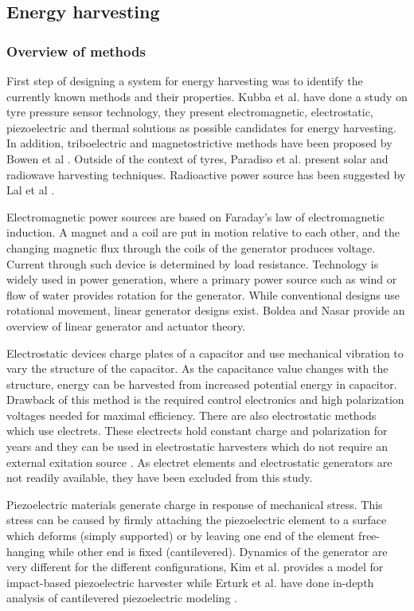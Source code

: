 \subsection{Energy harvesting}
\subsubsection{Overview of methods}
First step of designing a system for energy harvesting was to identify the currently known methods and their properties. Kubba et al. \cite{Kubba2014} have done a study on tyre pressure sensor technology, they present electromagnetic, electrostatic, piezoelectric and thermal solutions as possible candidates for energy harvesting. In addition, triboelectric and magnetostrictive methods have been proposed by Bowen et al \cite{Bowen2014}. Outside of the context of tyres, Paradiso et al. \cite{Paradiso2005} present solar and radiowave harvesting techniques. Radioactive power source has been suggested by Lal et al \cite{Lal2004}. 

Electromagnetic power sources are based on Faraday's law of electromagnetic induction. A magnet and a coil are put in motion relative to each other, and the changing magnetic flux through the coils of the generator produces voltage. Current through such device is determined by load resistance. Technology is widely used in power generation, where a primary power source such as wind or flow of water provides rotation for the generator. While conventional designs use rotational movement, linear generator designs exist. Boldea and Nasar \cite{Boldea1999} provide an overview of linear generator and actuator theory. 

Electrostatic devices charge plates of a capacitor and use mechanical vibration to vary the structure of the capacitor. As the capacitance value changes with the structure, energy can be harvested from increased potential energy in capacitor. Drawback of this method is the required control electronics and high polarization voltages needed for maximal efficiency. There are also electrostatic methods which use electrets. These electrects hold constant charge and polarization for years and they can be used in electrostatic harvesters which do not require an external exitation source \cite{Boisseau2012}. As electret elements and electrostatic generators are not readily available, they have been excluded from this study.

Piezoelectric materials generate charge in response of mechanical stress. This stress can be caused by firmly attaching the piezoelectric element to a surface which deforms (simply supported) or by leaving one end of the element free-hanging while other end is fixed (cantilevered). Dynamics of the generator are very different for the different configurations, Kim et al. \cite{Kim2014a} provides a model for impact-based piezoelectric harvester while Erturk et al. have done in-depth analysis of cantilevered piezoelectric modeling \cite{Erturk2009}. 

